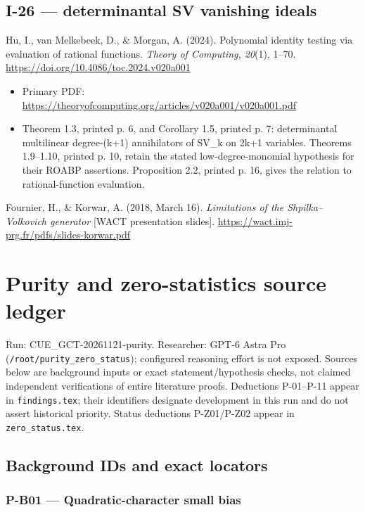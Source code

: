 \documentclass[11pt,a4paper]{article}
\providecommand{\tightlist}{\setlength{\itemsep}{0pt}\setlength{\parskip}{0pt}}
\theoremstyle{definition}\newtheorem{definition}{Definition}
\begin{document}
\subsection{I-26 --- determinantal SV vanishing
ideals}\label{i-26--determinantal-sv-vanishing-ideals}

Hu, I., van Melkebeek, D., \& Morgan, A. (2024). Polynomial identity
testing via evaluation of rational functions. \emph{Theory of Computing,
20}(1), 1--70. \url{https://doi.org/10.4086/toc.2024.v020a001}

\begin{itemize}
\tightlist
\item
  Primary PDF:
  \url{https://theoryofcomputing.org/articles/v020a001/v020a001.pdf}
\item
  Theorem 1.3, printed p. 6, and Corollary 1.5, printed p. 7:
  determinantal multilinear degree-(k+1) annihilators of SV\_k on 2k+1
  variables. Theorems 1.9--1.10, printed p. 10, retain the stated
  low-degree-monomial hypothesis for their ROABP assertions. Proposition
  2.2, printed p. 16, gives the relation to rational-function
  evaluation.
\end{itemize}

Fournier, H., \& Korwar, A. (2018, March 16). \emph{Limitations of the
Shpilka--Volkovich generator} {[}WACT presentation slides{]}.
\url{https://wact.imj-prg.fr/pdfs/slides-korwar.pdf}
\section{Purity and zero-statistics source
ledger}\label{purity-and-zero-statistics-source-ledger}

Run: CUE\_GCT-20261121-purity. Researcher: GPT-6 Astra Pro
(\nolinkurl{/root/purity_zero_status}); configured reasoning effort is
not exposed. Sources below are background inputs or exact
statement/hypothesis checks, not claimed independent verifications of
entire literature proofs. Deductions P-01--P-11 appear in
\nolinkurl{findings.tex}; their identifiers designate development in this
run and do not assert historical priority. Status deductions P-Z01/P-Z02
appear in \nolinkurl{zero_status.tex}.

\subsection{Background IDs and exact
locators}\label{background-ids-and-exact-locators}

\subsubsection{P-B01 --- Quadratic-character small
bias}\label{p-b01--quadratic-character-small-bias}
\end{document}
